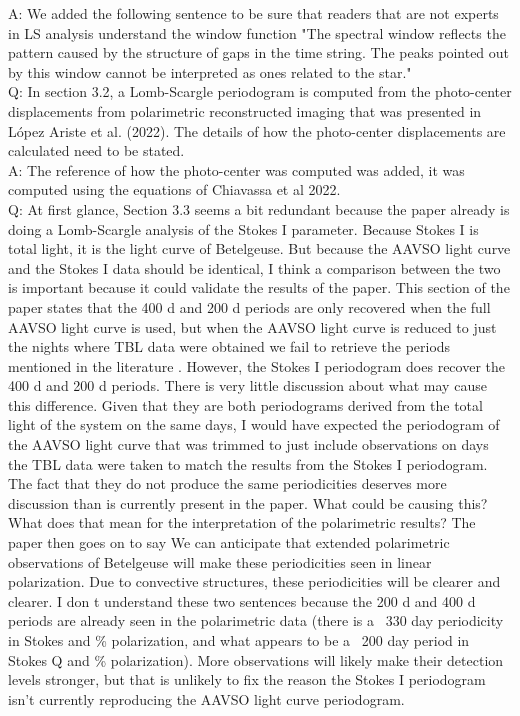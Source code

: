 \documentclass{article}
\begin{document}
A: We added the following sentence to be sure that readers that are not experts in LS analysis understand the window function "The spectral window reﬂects the pattern caused by the structure of gaps in the time string. The peaks pointed out by this window cannot be interpreted as ones related to the star."\\

Q: In section 3.2, a Lomb-Scargle periodogram is computed from the photo-center displacements
from polarimetric reconstructed imaging that was presented in López Ariste et al. (2022). The
details of how the photo-center displacements are calculated need to be stated.\\

A: The reference of how the photo-center was computed was added, it was computed using the equations of Chiavassa et al 2022.\\

Q: At first glance, Section 3.3 seems a bit redundant because the paper already is doing a
Lomb-Scargle analysis of the Stokes I parameter. Because Stokes I is total light, it is the light
curve of Betelgeuse. But because the AAVSO light curve and the Stokes I data should be
identical, I think a comparison between the two is important because it could validate the results
of the paper. This section of the paper states that the 400 d and 200 d periods are only
recovered when the full AAVSO light curve is used, but when the AAVSO light curve is reduced
to just the nights where TBL data were obtained we fail to retrieve the periods mentioned in the
literature . However, the Stokes I periodogram does recover the 400 d and 200 d periods. There
is very little discussion about what may cause this difference. Given that they are both
periodograms derived from the total light of the system on the same days, I would have
expected the periodogram of the AAVSO light curve that was trimmed to just include
observations on days the TBL data were taken to match the results from the Stokes I
periodogram. The fact that they do not produce the same periodicities deserves more
discussion than is currently present in the paper. What could be causing this? What does that
mean for the interpretation of the polarimetric results? The paper then goes on to say We can
anticipate that extended polarimetric observations of Betelgeuse will make these periodicities
seen in linear polarization. Due to convective structures, these periodicities will be clearer and
clearer. I don t understand these two sentences because the 200 d and 400 d periods are
already seen in the polarimetric data (there is a ~330 day periodicity in Stokes and
\% polarization, and what appears to be a ~200 day period in Stokes Q and \% polarization). More
observations will likely make their detection levels stronger, but that is unlikely to fix the reason
the Stokes I periodogram isn’t currently reproducing the AAVSO light curve periodogram.\\
\end{document}
